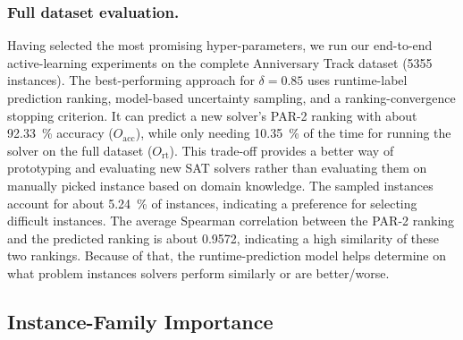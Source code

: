 \documentclass[runningheads]{llncs}
\begin{document}
\subsubsection{Full dataset evaluation.}

Having selected the most promising hyper-parame\-ters, we run our end-to-end active-learning experiments on the complete Anniversary Track dataset (5355 instances).
The best-performing approach for $\delta = 0.85$ uses runtime-label prediction ranking, model-based uncertainty sampling, and a ranking-convergence stopping criterion.
It can predict a new solver's PAR-2 ranking with about \SI{92.33}{\%} accuracy ($O_{\operatorname{acc}}$), while only needing \SI{10.35}{\%} of the time for running the solver on the full dataset ($O_{\operatorname{rt}}$).
This trade-off provides a better way of prototyping and evaluating new SAT solvers rather than evaluating them on manually picked instance based on domain knowledge.
The sampled instances account for about \SI{5.24}{\%} of instances, indicating a preference for selecting difficult instances.
The average Spearman correlation between the PAR-2 ranking and the predicted ranking is about \SI{0.9572}{}, indicating a high similarity of these two rankings.
Because of that, the runtime-prediction model helps determine on what problem instances solvers perform similarly or are better/worse.

\subsection{Instance-Family Importance}
\end{document}
